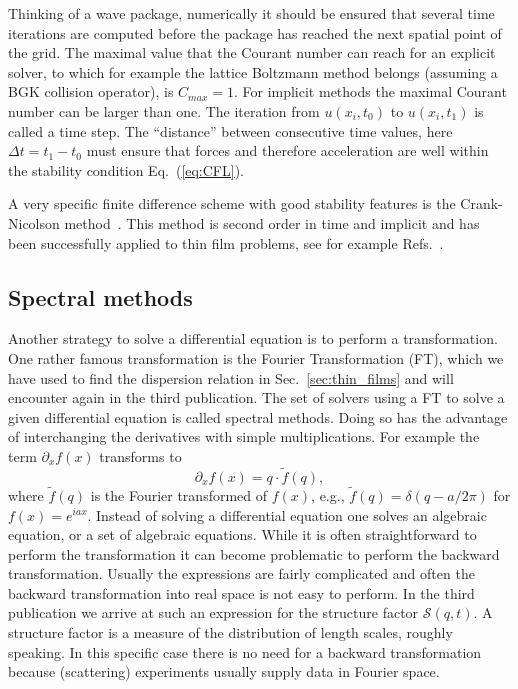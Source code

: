 Thinking of a wave package, numerically it should be ensured that several time iterations are computed before the package has reached the next spatial point of the grid.
The maximal value that the Courant number can reach for an explicit solver, to which for example the lattice Boltzmann method belongs (assuming a BGK collision operator), is $C_{max} = 1$.
For implicit methods the maximal Courant number can be larger than one.
The iteration from $u(x_i,t_0)$ to $u(x_i,t_1)$ is called a time step. 
The ``distance'' between consecutive time values, here $\Delta t = t_1 - t_0$ must ensure that forces and therefore acceleration are well within the stability condition Eq.~(\ref{eq:CFL}).

A very specific finite difference scheme with good stability features is the Crank-Nicolson method~\cite{crankPracticalMethodNumerical1947, pressNumericalRecipes3rd2007}.
This method is second order in time and implicit and has been successfully applied to thin film problems, see for example Refs.~\cite{diezGlobalModelsMoving2000, diezMetallicthinfilmInstabilitySpatially2016, munchDewettingRatesThin2005}.

\subsection{Spectral methods}
Another strategy to solve a differential equation is to perform a transformation.
One rather famous transformation is the Fourier Transformation (FT), which we have used to find the dispersion relation in Sec.~\ref{sec:thin_films} and will encounter again in the third publication.
The set of solvers using a FT to solve a given differential equation is called spectral methods.
Doing so has the advantage of interchanging the derivatives with simple multiplications.
For example the term $\partial_x f(x)$ transforms to  
\begin{equation}\label{eq:fourier_transform}
    \partial_x f(x) = q\cdot \tilde{f}(q),
\end{equation}
where $\tilde{f}(q)$ is the Fourier transformed of $f(x)$, e.g., $\tilde{f}(q) = \delta(q - a/2\pi)$ for $f(x) = e^{iax}$. 
Instead of solving a differential equation one solves an algebraic equation, or a set of algebraic equations.
While it is often straightforward to perform the transformation it can become problematic to perform the backward transformation. 
Usually the expressions are fairly complicated and often the backward transformation into real space is not easy to perform.
In the third publication we arrive at such an expression for the structure factor $\mathcal{S}(q, t)$.
A structure factor is a measure of the distribution of length scales, roughly speaking.
In this specific case there is no need for a backward transformation because (scattering) experiments usually supply data in Fourier space.

